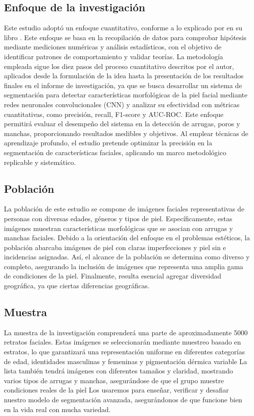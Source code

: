 \subsection{Enfoque de la investigación}
Este estudio adoptó un enfoque cuantitativo, conforme a lo explicado por \cite{bk_hernandez2014metodologia} en su libro . Este enfoque se basa en la recopilación de datos para comprobar hipótesis mediante mediciones numéricas y análisis estadísticos, con el objetivo de identificar patrones de comportamiento y validar teorías. La metodología empleada sigue los diez pasos del proceso cuantitativo descritos por el autor, aplicados desde la formulación de la idea hasta la presentación de los resultados finales en el informe de investigación, ya que se busca desarrollar un sistema de segmentación para detectar características morfológicas de la piel facial mediante redes neuronales convolucionales (CNN) y analizar su efectividad con métricas cuantitativas, como precisión, recall, F1-score y AUC-ROC. Este enfoque permitirá evaluar el desempeño del sistema en la detección de arrugas, poros y manchas, proporcionando resultados medibles y objetivos. \parencite{esteva2017} Al emplear técnicas de aprendizaje profundo, el estudio pretende optimizar la precisión en la segmentación de características faciales, aplicando un marco metodológico replicable y sistemático. \parencite{phillips2020}

\subsection{Población}
La población de este estudio se compone de imágenes faciales representativas de personas con diversas edades, géneros y tipos de piel. Específicamente, estas imágenes muestran características morfológicas que se asocian con arrugas y manchas faciales. Debido a la orientación del enfoque en el problemas estéticos, la población abarcaba imágenes de piel con claras imperfecciones y piel sin e incidencias asignadas. Así, el alcance de la población se determina como diverso y completo, asegurando la inclusión de imágenes que representa una amplia gama de condiciones de la piel. Finalmente, resulta esencial agregar diversidad geográfica, ya que ciertas diferencias geográficas.
\subsection{Muestra}
La muestra de la investigación comprenderá una parte de aproximadamente 5000 retratos faciales. Estas imágenes se seleccionarán mediante muestreo basado en estratos, lo que garantizará una representación uniforme en diferentes categorías de edad, identidades masculinas y femeninas y pigmentación dérmica variable La lista también tendrá imágenes con diferentes tamaños y claridad, mostrando varios tipos de arrugas y manchas, asegurándose de que el grupo muestre condiciones reales de la piel Los usaremos para enseñar, verificar y desafiar nuestro modelo de segmentación avanzada, asegurándonos de que funcione bien en la vida real con mucha variedad.


